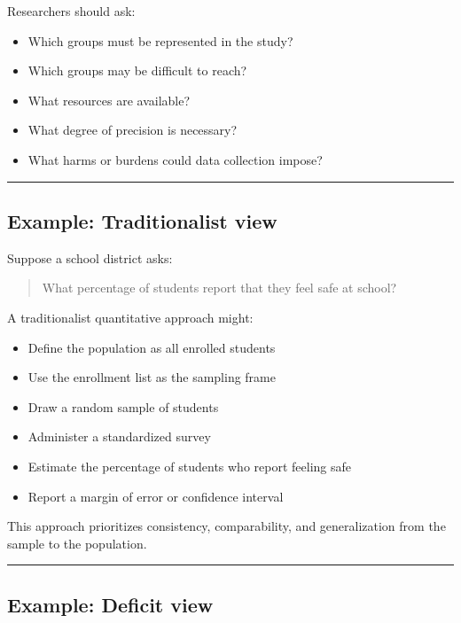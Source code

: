 \documentclass[
  letterpaper,
  DIV=11,
  numbers=noendperiod]{scrartcl}
\providecommand{\tightlist}{%
  \setlength{\itemsep}{0pt}\setlength{\parskip}{0pt}}\usepackage{longtable,booktabs,array}
\begin{document}
Researchers should ask:

\begin{itemize}
\tightlist
\item
  Which groups must be represented in the study?
\item
  Which groups may be difficult to reach?
\item
  What resources are available?
\item
  What degree of precision is necessary?
\item
  What harms or burdens could data collection impose?
\end{itemize}

\begin{center}\rule{0.5\linewidth}{0.5pt}\end{center}

\subsection{Example: Traditionalist
view}\label{example-traditionalist-view}

Suppose a school district asks:

\begin{quote}
What percentage of students report that they feel safe at school?
\end{quote}

A traditionalist quantitative approach might:

\begin{itemize}
\tightlist
\item
  Define the population as all enrolled students
\item
  Use the enrollment list as the sampling frame
\item
  Draw a random sample of students
\item
  Administer a standardized survey
\item
  Estimate the percentage of students who report feeling safe
\item
  Report a margin of error or confidence interval
\end{itemize}

This approach prioritizes consistency, comparability, and generalization
from the sample to the population.

\begin{center}\rule{0.5\linewidth}{0.5pt}\end{center}

\subsection{Example: Deficit view}\label{example-deficit-view}
\end{document}
